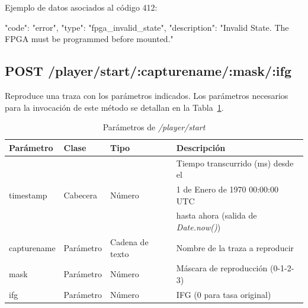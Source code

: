 \begin{itemize}
{\begin{minipage}{\textwidth}
Ejemplo de datos asociados al código 412:

\begin{code}[language=json]
{
  "code": "error",
  "type": "fpga_invalid_state",
  "description": "Invalid State. The FPGA must be programmed before mounted."
}
\end{code}
\end{minipage}
}

\end{itemize}

%
%
\subsection{POST /player/start/:capturename/:mask/:ifg}
Reproduce una \gls{traza} con los parámetros indicados.
Los parámetros necesarios para la invocación de este método se detallan en la Tabla~\ref{extra:api:playerstart:invocacion}.

\begin{table}[H]
\centering
\begin{tabular}{|l|l|l|l|}
\hline
\rowcolor[HTML]{F5F5F5}
\textbf{Parámetro}  & \textbf{Clase} & \textbf{Tipo}   & \textbf{Descripción}                        \\ \hline
                    &                &                 & Tiempo transcurrido (ms) desde el           \\
timestamp           & Cabecera       & Número          & 1 de Enero de 1970 00:00:00 UTC             \\
                    &                &                 & hasta ahora (salida de \textit{Date.now()}) \\ \hline
capturename         & Parámetro      & Cadena de texto & Nombre de la \gls{traza} a reproducir       \\ \hline
mask                & Parámetro      & Número          & Máscara de reproducción (0-1-2-3)           \\ \hline
ifg                 & Parámetro      & Número          & \gls{IFG} (0 para tasa original)            \\ \hline
\end{tabular}
\caption{Parámetros de \textit{/player/start}}
\label{extra:api:playerstart:invocacion}
\end{table}

